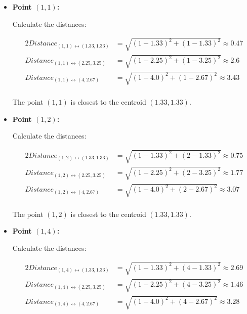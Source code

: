 \documentclass[
english,
smallborders
]{i6prcsht}
\begin{document}
\begin{solution}
\begin{enumerate}
		      \begin{itemize}
			      \item \textbf{Point $(1,1)$:}
			            
			            Calculate the distances:
			            
			            \begin{alignat*}{2}
				            Distance_{(1,1)\leftrightarrow(1.33,1.33)} & = \sqrt{(1-1.33)^2+(1-1.33)^2} \approx 0.47 \\
				            Distance_{(1,1)\leftrightarrow(2.25,3.25)} & = \sqrt{(1-2.25)^2+(1-3.25)^2} \approx 2.6  \\
				            Distance_{(1,1)\leftrightarrow(4,2.67)}    & = \sqrt{(1-4.0)^2+(1-2.67)^2} \approx 3.43  \\
			            \end{alignat*}
			            
			            The point $(1,1)$ is closest to the centroid $(1.33,1.33)$.
			            
			      \item \textbf{Point $(1,2)$:}
			            
			            Calculate the distances:
			            
			            \begin{alignat*}{2}
				            Distance_{(1,2)\leftrightarrow(1.33,1.33)} & = \sqrt{(1-1.33)^2+(2-1.33)^2} \approx 0.75 \\
				            Distance_{(1,2)\leftrightarrow(2.25,3.25)} & = \sqrt{(1-2.25)^2+(2-3.25)^2} \approx 1.77 \\
				            Distance_{(1,2)\leftrightarrow(4,2.67)}    & = \sqrt{(1-4.0)^2+(2-2.67)^2} \approx 3.07  \\
			            \end{alignat*}
			            
			            The point $(1,2)$ is closest to the centroid $(1.33,1.33)$.
			            
			      \item \textbf{Point $(1,4)$:}
			            
			            Calculate the distances:
			            
			            \begin{alignat*}{2}
				            Distance_{(1,4)\leftrightarrow(1.33,1.33)} & = \sqrt{(1-1.33)^2+(4-1.33)^2} \approx 2.69 \\
				            Distance_{(1,4)\leftrightarrow(2.25,3.25)} & = \sqrt{(1-2.25)^2+(4-3.25)^2} \approx 1.46 \\
				            Distance_{(1,4)\leftrightarrow(4,2.67)}    & = \sqrt{(1-4.0)^2+(4-2.67)^2} \approx 3.28  \\
			            \end{alignat*}
			            

\end{itemize}
\end{enumerate}
\end{solution}
\end{document}
